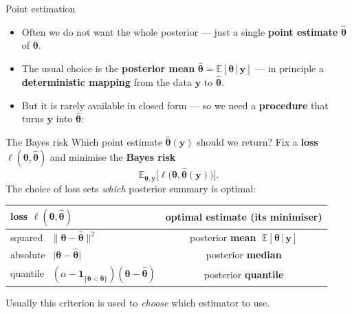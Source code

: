 \documentclass[aspectratio=169,11pt]{beamer}
\newcommand{\E}{\mathbb{E}}
\newcommand{\given}{\,|\,}
\newcommand{\bt}{\bm{\theta}}
\newcommand{\by}{\mathbf{y}}
\begin{document}
\begin{frame}{Point estimation}
  \begin{itemize}
    \item Often we do not want the whole posterior --- just a single \textbf{point estimate} $\hat{\bt}$ of $\bt$.
    \item The usual choice is the \textbf{posterior mean} $\hat{\bt}=\E[\bt\given\by]$ --- in principle a \textbf{deterministic mapping} from the data $\by$ to $\hat{\bt}$.
    \item But it is \alert{rarely available in closed form} --- so we need a \textbf{procedure} that turns $\by$ into $\hat{\bt}$:
  \end{itemize}
  \vspace{0.5em}
  \begin{center}
  \end{center}
  \vspace{0.4em}
\end{frame}

\begin{frame}{The Bayes risk}
  Which point estimate $\hat{\bt}(\by)$ should we return? Fix a \textbf{loss} $\ell(\bt,\hat{\bt})$ and minimise the \textbf{Bayes risk}
  \[ \E_{\bt,\by}\big[\ell\big(\bt,\hat{\bt}(\by)\big)\big]. \]
  The choice of loss sets \emph{which} posterior summary is optimal:
  \begin{center}
  \renewcommand{\arraystretch}{1.1}
  \begin{tabular}{lc}
    \toprule
    loss $\ell(\bt,\hat{\bt})$ & optimal estimate (its minimiser) \\
    \midrule
    squared \ $\lVert\bt-\hat{\bt}\rVert^2$ & posterior \textbf{mean} $\;\E[\bt\given\by]$ \\
    absolute \ $\lvert\bt-\hat{\bt}\rvert$ & posterior \textbf{median} \\
    quantile \ $(\alpha-\mathbf{1}_{\{\bt<\hat{\bt}\}})(\bt-\hat{\bt})$ & posterior \textbf{quantile} \\
    \bottomrule
  \end{tabular}
  \end{center}
  \vspace{-0.1em}
  {\footnotesize Usually this criterion is used to \emph{choose} which estimator to use.}
\end{frame}
\end{document}
